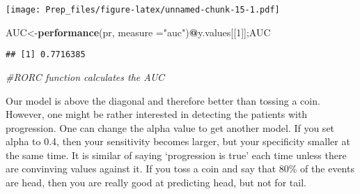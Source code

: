 \documentclass[]{article}
\newenvironment{Shaded}{\begin{snugshade}}{\end{snugshade}}
\newcommand{\CommentTok}[1]{\textcolor[rgb]{0.56,0.35,0.01}{\textit{#1}}}
\newcommand{\DataTypeTok}[1]{\textcolor[rgb]{0.13,0.29,0.53}{#1}}
\newcommand{\DecValTok}[1]{\textcolor[rgb]{0.00,0.00,0.81}{#1}}
\newcommand{\KeywordTok}[1]{\textcolor[rgb]{0.13,0.29,0.53}{\textbf{#1}}}
\newcommand{\NormalTok}[1]{#1}
\newcommand{\OperatorTok}[1]{\textcolor[rgb]{0.81,0.36,0.00}{\textbf{#1}}}
\newcommand{\StringTok}[1]{\textcolor[rgb]{0.31,0.60,0.02}{#1}}
\begin{document}
\begin{Shaded}
\end{Shaded}

\texttt{[image: Prep\_files/figure-latex/unnamed-chunk-15-1.pdf]}

\begin{Shaded}
\begin{Highlighting}[]
\NormalTok{AUC<-}\KeywordTok{performance}\NormalTok{(pr, }\DataTypeTok{measure =}\StringTok{"auc"}\NormalTok{)}\OperatorTok{@}\NormalTok{y.values[[}\DecValTok{1}\NormalTok{]];AUC}
\end{Highlighting}
\end{Shaded}

\begin{verbatim}
## [1] 0.7716385
\end{verbatim}

\begin{Shaded}
\begin{Highlighting}[]
\CommentTok{#RORC function calculates the AUC}
\end{Highlighting}
\end{Shaded}

Our model is above the diagonal and therefore better than tossing a
coin. However, one might be rather interested in detecting the patients
with progression. One can change the alpha value to get another model.
If you set alpha to 0.4, then your sensitivity becomes larger, but your
specificity smaller at the same time. It is similar of saying
`progression is true' each time unless there are convinving values
against it. If you toss a coin and say that 80\% of the events are head,
then you are really good at predicting head, but not for tail.
\end{document}
